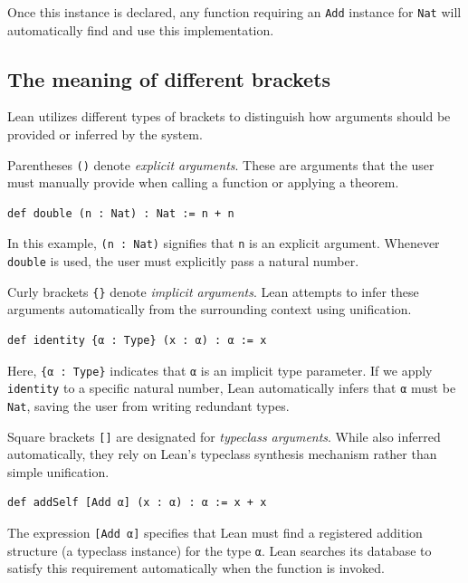 Once this instance is declared, any function requiring an \lstinline|Add| instance for \lstinline|Nat| will automatically find and use this implementation.

\subsection{The meaning of different brackets}
\label{sec:brackets}

Lean utilizes different types of brackets to distinguish how arguments should be provided or inferred by the system.

Parentheses \lstinline|()| denote \emph{explicit arguments}. These are arguments that the user must manually provide when calling a function or applying a theorem.

\begin{lstlisting}[language=Lean]
def double (n : Nat) : Nat := n + n
\end{lstlisting}

In this example, \lstinline|(n : Nat)| signifies that \lstinline|n| is an explicit argument. Whenever \lstinline|double| is used, the user must explicitly pass a natural number.

Curly brackets \lstinline|{}| denote \emph{implicit arguments}. Lean attempts to infer these arguments automatically from the surrounding context using unification.

\begin{lstlisting}[language=Lean]
def identity {α : Type} (x : α) : α := x
\end{lstlisting}

Here, \lstinline|{α : Type}| indicates that \lstinline|α| is an implicit type parameter. If we apply \lstinline|identity| to a specific natural number, Lean automatically infers that \lstinline|α| must be \lstinline|Nat|, saving the user from writing redundant types.

Square brackets \lstinline|[]| are designated for \emph{typeclass arguments}. While also inferred automatically, they rely on Lean's typeclass synthesis mechanism rather than simple unification.

\begin{lstlisting}[language=Lean]
def addSelf [Add α] (x : α) : α := x + x
\end{lstlisting}

The expression \lstinline|[Add α]| specifies that Lean must find a registered addition structure (a typeclass instance) for the type \lstinline|α|. Lean searches its database to satisfy this requirement automatically when the function is invoked.

